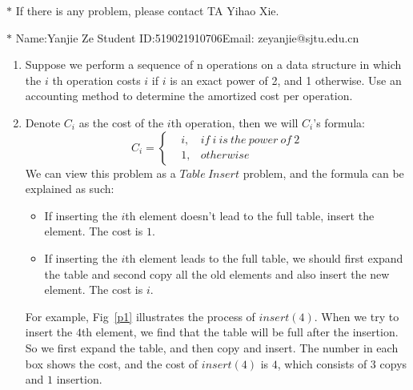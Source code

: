 \documentclass[12pt,a4paper]{article}
\makeatletter
\newtheorem*{solution}{Solution}
\theoremstyle{definition}
\renewenvironment{solution}[1][Solution] {\par\pushQED{\qed}\normalfont\topsep6\p@\@plus6\p@\relax\trivlist\item[\hskip\labelsep\bfseries#1\@addpunct{.}]\ignorespaces}{\popQED\endtrivlist\@endpefalse} \makeatother
\makeatother
\begin{document}
\noindent

\noindent{}
\begin{center}
\footnotesize{\color{red}$*$ If there is any problem, please contact TA Yihao Xie. }

\footnotesize{\color{blue}$*$ Name:Yanjie Ze  \quad Student ID:519021910706\quad Email: zeyanjie@sjtu.edu.cn}
\end{center}
\begin{enumerate}
	\item Suppose we perform a sequence of n operations on a data structure in which the $i$ th 		operation costs $i$ if $i$ is an exact power of 2, and 1 otherwise. Use an accounting method to determine the amortized cost per operation.
\begin{solution}
Denote $C_i$ as the cost of the $i$th operation, then we will $C_i$'s formula:
    $$ 
			C_i=\left\{
            \begin{aligned}
            &i, &if\ i\ is\ the\ power\ of\ 2\\
            &1, &otherwise 
            \end{aligned}
            \right.
            $$
We can view this problem as a $Table\ Insert$ problem, and the formula can be explained as such:
\begin{itemize}
    \item If inserting the $i$th element doesn't lead to the full table, insert the element. The cost is $1$.
    \item If inserting the $i$th element leads to the full table, we should first expand the table and second copy all the old elements and also insert the new element. The cost is $i$.
\end{itemize}
For example, Fig~\ref{p1} illustrates the process of $insert(4)$. When we try to insert the $4$th element, we find that the table will be full after the insertion. So we first expand the table, and then copy and insert. The number in each box shows the cost, and the cost of $insert(4)$ is $4$, which consists of $3$ copys and $1$ insertion. 


\end{solution}
\end{enumerate}
\end{document}

